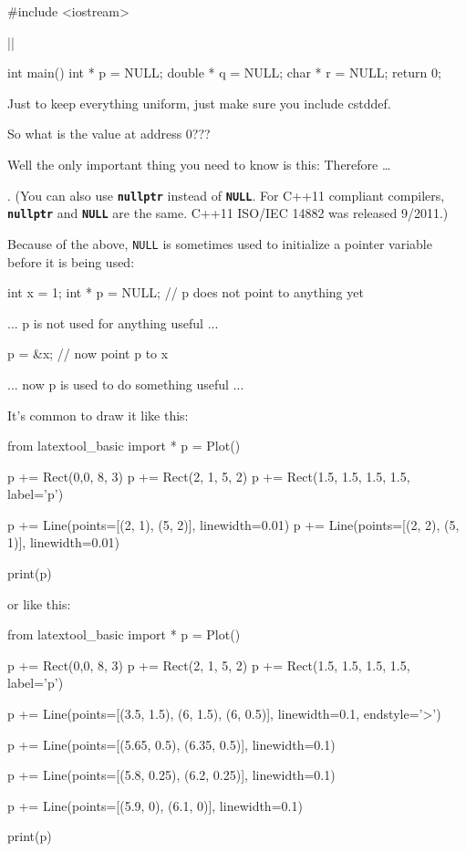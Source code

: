 \begin{consolethree}[escapeinside=||]
#include <iostream>

||

int main()
{
    int * p = NULL;
    double * q = NULL;
    char * r = NULL;
    return 0;
}
\end{consolethree}
Just to keep everything uniform, just make sure you include cstddef.

So what is the value at address 0???

Well the only important thing you need to know is this:  Therefore \ldots{}

. (You can also use \texttt{\textbf{nullptr}} instead of \texttt{\textbf{NULL}}. For C++11 compliant compilers, \texttt{\textbf{nullptr}} and \texttt{\textbf{NULL}} are the same. C++11 ISO/IEC 14882 was released 9/2011.)

Because of the above, \texttt{NULL} is sometimes used to initialize a pointer variable before it is being used:

\begin{consolethree}[escapeinside=||]
int x = 1;
int * p = NULL;   // p does not point to anything yet

... p is not used for anything useful ...

p = \&x;          // now point p to x

... now p is used to do something useful ...
\end{consolethree}

It's common to draw it like this:

\begin{python}
from latextool_basic import *
p = Plot()

p += Rect(0,0, 8, 3)
p += Rect(2, 1, 5, 2)
p += Rect(1.5, 1.5, 1.5, 1.5, label='p')

p += Line(points=[(2, 1), (5, 2)], linewidth=0.01)
p += Line(points=[(2, 2), (5, 1)], linewidth=0.01)

print(p)
\end{python}

or like this:

\begin{python}
from latextool_basic import *
p = Plot()

p += Rect(0,0, 8, 3)
p += Rect(2, 1, 5, 2)
p += Rect(1.5, 1.5, 1.5, 1.5, label='p')

p += Line(points=[(3.5, 1.5), (6, 1.5), (6, 0.5)], linewidth=0.1, endstyle='>')

p += Line(points=[(5.65, 0.5), (6.35, 0.5)], linewidth=0.1)

p += Line(points=[(5.8, 0.25), (6.2, 0.25)], linewidth=0.1)

p += Line(points=[(5.9, 0), (6.1, 0)], linewidth=0.1)

print(p)
\end{python}


